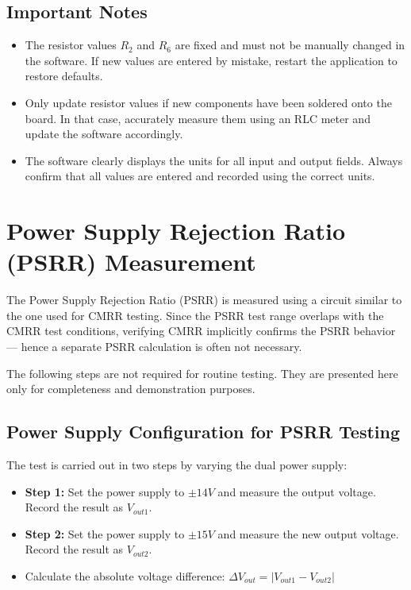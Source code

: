 \documentclass[a4paper,12pt]{article}
\begin{document}
\subsection*{Important Notes}

\begin{itemize}
  \item The resistor values \( R_2 \) and \( R_6 \) are fixed and must not be manually changed in the software. If new values are entered by mistake, restart the application to restore defaults.
  \item Only update resistor values if new components have been soldered onto the board. In that case, accurately measure them using an RLC meter and update the software accordingly.
  \item The software clearly displays the units for all input and output fields. Always confirm that all values are entered and recorded using the correct units.
\end{itemize}

\newpage
\section{Power Supply Rejection Ratio (PSRR) Measurement}

The Power Supply Rejection Ratio (PSRR) is measured using a circuit similar to the one used for CMRR testing.  
Since the PSRR test range overlaps with the CMRR test conditions, verifying CMRR implicitly confirms the PSRR behavior — hence a separate PSRR calculation is often not necessary.

\begin{tcolorbox}[colback=yellow!5!white, colframe=yellow!80!black, title=Note]
The following steps are not required for routine testing. They are presented here only for completeness and demonstration purposes.
\end{tcolorbox}

\subsection*{Power Supply Configuration for PSRR Testing}

The test is carried out in two steps by varying the dual power supply:

\begin{itemize}
  \item \textbf{Step 1:} Set the power supply to \( \pm14V \) and measure the output voltage. Record the result as \( V_{out1} \).
  \item \textbf{Step 2:} Set the power supply to \( \pm15V \) and measure the new output voltage. Record the result as \( V_{out2} \).
  \item Calculate the absolute voltage difference: \( \Delta V_{out} = |V_{out1} - V_{out2}| \)
\end{itemize}
\end{document}

